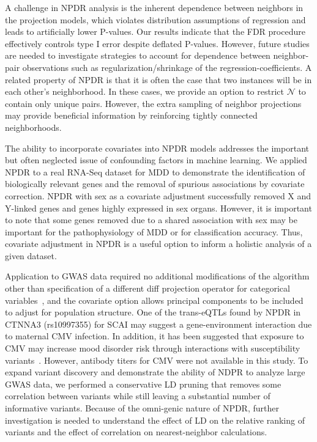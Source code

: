 \documentclass{bioinfo}
\begin{document}
A challenge in NPDR analysis is the inherent dependence between neighbors in the projection models, which violates distribution assumptions of regression and leads to artificially lower P-values. Our results indicate that the FDR procedure effectively controls type I error despite deflated P-values. However, future studies are needed to investigate strategies to account for dependence between neighbor-pair observations such as regularization/shrinkage of the regression-coefficients\cite{de2010benchmark}. A related property of NPDR is that it is often the case that two instances will be in each other's neighborhood. In these cases, we provide an option to restrict $\mathcal{N}$ to contain only unique pairs. However, the extra sampling of neighbor projections may provide beneficial information by reinforcing tightly connected neighborhoods.  

The ability to incorporate covariates into NPDR models addresses the important but often neglected issue of confounding factors in machine learning.
We applied NPDR to a real RNA-Seq dataset for MDD to demonstrate the identification of biologically relevant genes and the removal of spurious associations by covariate correction.
NPDR with sex as a covariate adjustment successfully removed X and Y-linked genes and genes highly expressed in sex organs.
However, it is important to note that some genes removed due to a shared association with sex may be important for the pathophysiology of MDD or for classification accuracy.
Thus, covariate adjustment in NPDR is a useful option to inform a holistic analysis of a given dataset.

Application to GWAS data required no additional modifications of the algorithm other than specification of a different diff projection operator for categorical variables~\cite{titv}, and the covariate option allows principal components to be included to adjust for population structure.
One of the trans-eQTLs found by NPDR in CTNNA3 (rs10997355) for SCAI may suggest a gene-environment interaction due to maternal CMV infection.
In addition, it has been suggested that exposure to CMV may increase mood disorder risk through interactions with susceptibility variants~\cite{kim2007exposure}.
However, antibody titers for CMV were not available in this study.
To expand variant discovery and demonstrate the ability of NDPR to analyze large GWAS data, we performed a conservative LD pruning that removes some correlation between variants while still leaving a substantial number of informative variants.
Because of the omni-genic nature of NPDR, further investigation is needed to understand the effect of LD on the relative ranking of variants and the effect of correlation on nearest-neighbor calculations. 
\end{document}
